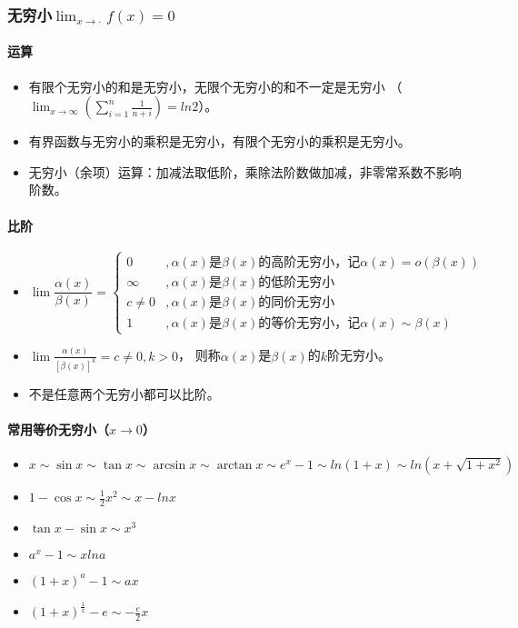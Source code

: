 \documentclass[
12pt, %
a4paper, 
oneside, %
headinclude,footinclude, %
]{scrartcl}
\begin{document}
\subsubsection{无穷小$ \lim_{x \to \cdot} f(x) = 0 $}
\paragraph{运算}
\begin{itemize}
\item 有限个无穷小的和是无穷小，无限个无穷小的和不一定是无穷小
（$ \lim_{x \to \infty}(\sum_{i = 1}^{n}  \frac{1}{n + i}) = ln 2 $）。
\item 有界函数与无穷小的乘积是无穷小，有限个无穷小的乘积是无穷小。
\item 无穷小（余项）运算：加减法取低阶，乘除法阶数做加减，非零常系数不影响阶数。
\end{itemize}
\paragraph{比阶}
\begin{itemize}
\item 
$$
\lim \frac{\alpha(x)}{\beta(x)}=
\begin{cases}
0 &, \alpha(x) \text{是} \beta(x) \text{的高阶无穷小，记} \alpha(x) = o(\beta(x)) \\
\infty &, \alpha(x) \text{是} \beta(x) \text{的低阶无穷小} \\
c \neq 0 &, \alpha(x) \text{是} \beta(x) \text{的同价无穷小} \\
1 &, \alpha(x) \text{是} \beta(x) \text{的等价无穷小，记} \alpha(x) \sim \beta(x)
\end{cases}
$$
\item $ \lim \frac{\alpha(x)}{[\beta(x)]^k} = c \neq 0, k > 0 $，
则称$ \alpha(x) $是$ \beta(x) $的$ k $阶无穷小。
\item 不是任意两个无穷小都可以比阶。
\end{itemize}
\paragraph{常用等价无穷小（$ x \rightarrow 0 $）}
\begin{itemize}
\item $ x \sim \sin x \sim \tan x \sim \arcsin x \sim \arctan x \sim e^x -1 \sim ln(1 + x) \sim ln(x + \sqrt{1 + x^2}) $
\item $ 1 - \cos x \sim \frac{1}{2}x^2 \sim x - lnx $
\item $ \tan x - \sin x \sim x^3 $
\item $ a^x -1 \sim x ln a $
\item $ (1 + x)^a - 1 \sim ax $
\item $ (1 + x)^{\frac{1}{x}} - e \sim -\frac{e}{2}x $
\end{itemize}
\end{document}
